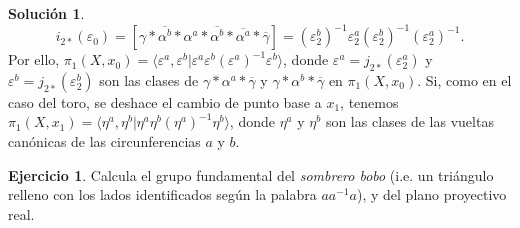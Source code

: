 \documentclass{article}
\theoremstyle{plain}
\theoremstyle{definition}
\newtheorem{exercise}{Ejercicio}
\newtheorem*{sol*}{Solución}
\begin{document}
\begin{sol*}
\[
i_{2*}(\varepsilon_0)=[\gamma*\overline{\alpha^b}*\alpha^a*\overline{\alpha^b}*\overline{\alpha^a}*\overline{\gamma}]=(\varepsilon_2^{b})^{-1}\varepsilon_2^{a}(\varepsilon_2^{b})^{-1}(\varepsilon_2^a)^{-1}.
\]
Por ello, $\pi_1(X,x_0)=\langle\varepsilon^a,\varepsilon^b|\varepsilon^{a}\varepsilon^{b}(\varepsilon^{a})^{-1}\varepsilon^b\rangle$, donde $\varepsilon^{a}=j_{2*}(\varepsilon^{a}_2)$ y $\varepsilon^{b}=j_{2*}(\varepsilon^{b}_2)$ son las clases de $\gamma*\alpha^a*\overline{\gamma}$ y $\gamma*\alpha^b*\overline{\gamma}$ en $\pi_1(X,x_0)$. Si, como en el caso del toro, se deshace el cambio de punto base a $x_1$, tenemos $\pi_1(X,x_1)=\langle\eta^a,\eta^b|\eta^{a}\eta^{b}(\eta^{a})^{-1}\eta^b\rangle$, donde $\eta^a$ y $\eta^b$ son las clases de las vueltas canónicas de las circunferencias $a$ y $b$.
\end{sol*}

\newpage

\begin{exercise}

Calcula el grupo fundamental del \emph{sombrero bobo} (i.e. un tri\'angulo relleno con los lados identificados seg\'un la palabra $aa^{-1}a$), y del plano proyectivo real.

\end{exercise}
\end{document}
